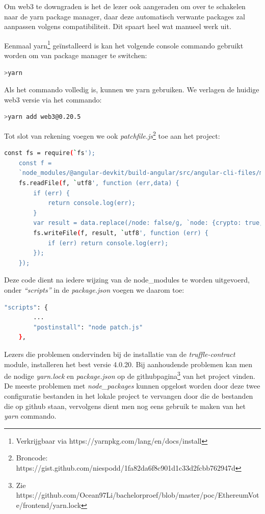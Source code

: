 	Om web3 te downgraden is het de lezer ook aangeraden om over te schakelen naar de yarn package manager, daar deze automatisch verwante packages zal aanpassen volgens compatibiliteit.
	Dit spaart heel wat manueel werk uit. 
	
	Eenmaal yarn\footnote{Verkrijgbaar via https://yarnpkg.com/lang/en/docs/install} geïnstalleerd is kan het volgende console commando gebruikt worden om van package manager te switchen:
	\begin{lstlisting}[numbers=none,language=bash]
	>yarn
	\end{lstlisting}
	Als het commando volledig is, kunnen we yarn gebruiken. We verlagen de huidige web3 versie via het commando:
	\begin{lstlisting}[numbers=none,language=bash]
	>yarn add web3@0.20.5
	\end{lstlisting}
	Tot slot van rekening voegen we ook \textit{patchfile.js}\footnote{Broncode: https://gist.github.com/niespodd/1fa82da6f8c901d1c33d2fcbb762947d} toe aan het project:
	\begin{lstlisting}[numbers=none,language=bash]
	const fs = require(`fs');
	const f = 
	`node_modules/@angular-devkit/build-angular/src/angular-cli-files/models/webpack-configs/browser.js';
	fs.readFile(f, `utf8', function (err,data) {
		if (err) {
			return console.log(err);
		}
		var result = data.replace(/node: false/g, `node: {crypto: true, stream: true}');
		fs.writeFile(f, result, `utf8', function (err) {
			if (err) return console.log(err);
		});
	});
	\end{lstlisting}
	Deze code dient na iedere wijzing van de node\_modules te worden uitgevoerd, onder \textit{``scripts''} in de \textit{package.json} voegen we daarom toe:
	\begin{lstlisting}[numbers=none,language=bash]
	"scripts": {
		...
		"postinstall": "node patch.js"
	},
	\end{lstlisting}
	Lezers die problemen ondervinden bij de  installatie van de \textit{truffle-contract} module, installeren het best versie 4.0.20. Bij aanhoudende problemen kan men de nodige \textit{yarn.lock }en \textit{package.json} op de githubpagina\footnote{Zie https://github.com/Ocean97Li/bachelorproef/blob/master/poc/EthereumVote/frontend/yarn.lock} van het project vinden. De meeste problemen met \textit{node\_packages} kunnen opgelost worden door deze twee configuratie bestanden in het lokale project te vervangen door die de bestanden die op github staan, vervolgens dient men nog eens gebruik te maken van het \textit{yarn} commando.
	
